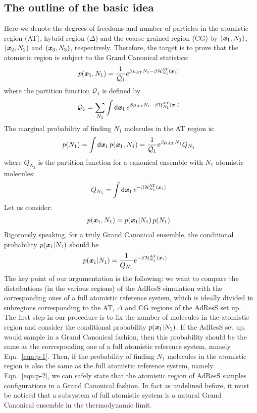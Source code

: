 \documentclass[aip,jcp,a4paper,reprint,onecolumn]{revtex4-1}
\newcommand{\vect}[1]{\textbf{\textit{#1}}}
\newcommand{\dd}[1]{\textsf{#1}}
\newcommand{\AT}{{\textrm{{AT}}}}
\newcommand{\HY}{{\Delta}}
\begin{document}
\subsection{The outline of the basic idea}
Here we denote the degrees of freedoms and number of particles in the
atomistic region (AT), hybrid region ($\HY$) and the coarse-grained
region (CG) by $(\vect x_1, N_1)$, $(\vect x_2, N_2)$ and $(\vect x_3,
N_3)$, respectively. Therefore, the target is to prove that the atomistic
region is subject to the Grand Canonical statistics: 
\begin{align}\label{eqn:p}
  p(\vect x_1, N_1) = \frac{1}{\mathcal Q_1}
  e^{\beta\mu_{\AT} N_1 - \beta \mathcal H_{N_1}^{\AT}(\vect x_1)} 
\end{align}
where the partition function $\mathcal Q_1$ is defined by
\begin{align}
  \mathcal Q_1 =
  \sum_{N_1}\int
  \dd d\vect x_1\,
  e^{\beta\mu_{\AT} N_1 - \beta \mathcal H_{N_1}^{\AT}(\vect x_1)}
\end{align}
The marginal probability of finding $N_1$ molecules in the
AT region is:
\begin{align}\label{eqn:p-2}
  p(N_1) = \int\dd d\vect x_1\, p(\vect x_1, N_1)
  =
  \frac{1}{\mathcal Q_1}e^{\beta\mu_{AT} N_1}Q_{N_1}
\end{align}
where $Q_{N_1}$ is the partition function for a canonical ensemble
with $N_1$ atomistic molecules:
\begin{align}
  Q_{N_1}  =
  \int\dd d\vect x_1\,
  e^{ - \beta \mathcal H_{N_1}^{\AT}(\vect x_1)}
\end{align}
Let us consider:
\begin{align}
  p(\vect x_1, N_1) = p(\vect x_1 | N_1)\,p(N_1)
\end{align}
Rigorously speaking, for a truly Grand Canonical ensemble,
the conditional probability $p(\vect x_1 | N_1)$ 
should be
\begin{align}\label{eqn:p-1}
  p(\vect x_1 | N_1) &= \frac{1}{Q_{N_1}} e^{-\beta \mathcal H_{N_1}^{AT}(\vect x_1)} \end{align}
The key point of our argumentation is the following: we want to compare
the distributions (in the various regions) of the AdResS simulation
with the corresponding ones of a full atomistic reference system, which is ideally divided
in subregions corresponding to the AT, $\HY$ and CG regions of the AdResS
set up. The first step in our procedure is to fix the number of molecules in the atomistic
region and consider the conditional probability $p(\vect x_1 |
N_1)$. If the AdResS set up, would sample in a Grand Canonical fashion, then this
probability should be the same as the corresponding one of a full
atomistic reference system, namely Eqn.~\eqref{eqn:p-1}.  Then, if the
probability of finding $N_1$ molecules in the atomistic region is also
the same as the full atomistic reference system, namely
Eqn.~\eqref{eqn:p-2}, we can safely state that the atomistic region of AdResS
samples configurations in a Grand Canonical fashion. In fact as undelined before, it must be noticed that a subsystem of full atomistic system is a natural Grand Canonical ensemble in the thermodynamic limit. 
\end{document}
